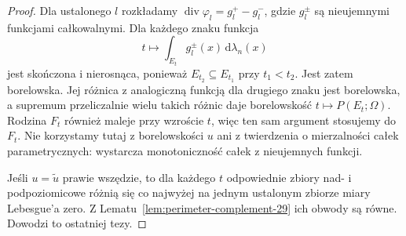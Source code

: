 \begin{proof}
Dla ustalonego $l$ rozkładamy
$\operatorname{div}\varphi_l=g_l^+-g_l^-$,
gdzie $g_l^\pm$ są nieujemnymi funkcjami
całkowalnymi. Dla każdego znaku funkcja
\[
 t\longmapsto\int_{E_t}g_l^\pm(x)\,
 \mathrm d\lambda_n(x)
\]
jest skończona i nierosnąca, ponieważ
$E_{t_2}\subseteq E_{t_1}$ przy $t_1<t_2$.
Jest zatem borelowska. Jej różnica z analogiczną
funkcją dla drugiego znaku jest borelowska,
a supremum przeliczalnie wielu takich różnic
daje borelowskość $t\mapsto P(E_t;\Omega)$.
Rodzina $F_t$ również maleje przy wzroście $t$,
więc ten sam argument stosujemy do $F_t$.
Nie korzystamy tutaj z borelowskości $u$
ani z twierdzenia o mierzalności całek
parametrycznych: wystarcza monotoniczność
całek z nieujemnych funkcji.

Jeśli $u=\widetilde u$ prawie wszędzie, to dla
każdego $t$ odpowiednie zbiory nad- i podpoziomicowe różnią
się co najwyżej na jednym ustalonym zbiorze
miary Lebesgue'a zero. Z Lematu~\ref{lem:perimeter-complement-29}
ich obwody są równe. Dowodzi to ostatniej tezy.
\end{proof}

